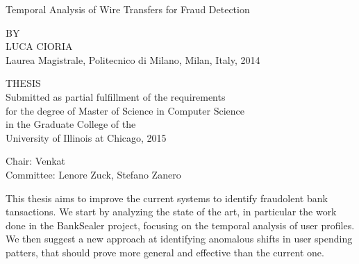 \documentclass[letterpaper,11pt,oneside,final]{uicthesis}
\newcommand{\thesisTitle}{Temporal Analysis of Wire Transfers for Fraud Detection}
\begin{document}
	\begin{titlepage}
	\vspace*{\fill}
	\begin{spacing}{1.5}
	\begin{center}

		{\Large \thesisTitle}

		\vspace{4.2cm}
    BY\\

    LUCA CIORIA\\
		\vspace{0.2cm}
    Laurea Magistrale, Politecnico di Milano, Milan, Italy, 2014

		\vspace{3.2cm}
    THESIS\\
		\vspace{0.2cm}
    Submitted as partial fulfillment of the requirements\\
    for the degree of Master of Science in Computer Science\\
    in the Graduate College of the\\
    University of Illinois at Chicago, 2015
		\vspace{0.5cm}
    \begin{flushleft}
    Chair: Venkat\\
    Committee:  Lenore Zuck, Stefano Zanero
    \end{flushleft}

	\end{center}

	\end{spacing}
	\vspace*{\fill}
	\end{titlepage}

	\dedication
		


	\setcounter{tocdepth}{2}
	\tableofcontents
	\listoftables
	\listoffigures

   \summary \label{summary}
   This thesis aims to improve the current systems to identify fraudolent bank tansactions. We start by analyzing the state of the art, in particular the work done in the BankSealer project, focusing on the temporal analysis of user profiles. We then suggest a new approach at identifying anomalous shifts in user spending patters, that should prove more general and effective than the current one.
\end{document}
